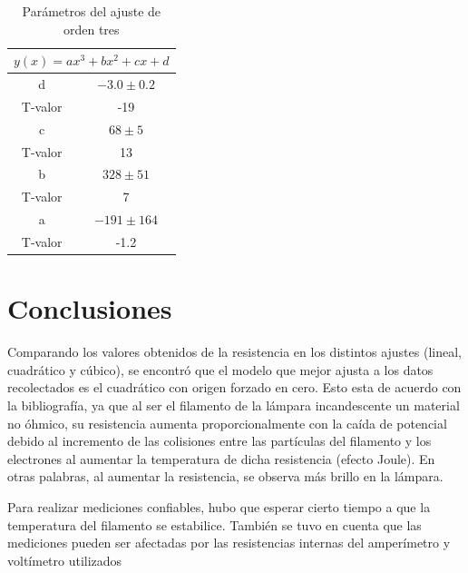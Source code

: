 \documentclass[twoside,twocolumn,a4paper]{article}
\begin{document}
\begin{table}
\centering
\caption{Par\'ametros del ajuste de orden tres}
\label{tab:o3}
\begin{tabular}{|c|c|}
\hline
\multicolumn{2}{|c|}{$y(x)=ax^3+bx^2+cx+d$} \\ \hline
d                  & $-3.0\pm0.2$           \\ \hline
T-valor            & -19                    \\ \hline
c                  & $68\pm5$               \\ \hline
T-valor            & 13                     \\ \hline
b                  & $328\pm51$             \\ \hline
T-valor            & 7                      \\ \hline
a                  & $-191\pm164$           \\ \hline
T-valor            & -1.2                   \\ \hline
\end{tabular}
\end{table}




\section{Conclusiones}


Comparando los valores obtenidos de la resistencia en los distintos ajustes (lineal, cuadr\'atico y c\'ubico), se encontr\'o que el modelo que mejor ajusta a los datos recolectados es el cuadr\'atico con origen forzado en cero. Esto esta de acuerdo con la bibliograf\'ia, ya que al ser el filamento de la l\'ampara incandescente un material no \'ohmico, su resistencia aumenta proporcionalmente con la ca\'ida de potencial debido al incremento de las colisiones entre las part\'iculas del filamento y los electrones al aumentar la temperatura de dicha resistencia (efecto Joule). En otras palabras, al aumentar la resistencia, se observa m\'as brillo en la l\'ampara.
\par Para realizar mediciones confiables, hubo que esperar cierto tiempo a que la temperatura del filamento se estabilice. Tambi\'en se tuvo en cuenta que las mediciones pueden ser afectadas por las resistencias internas del amper\'imetro y volt\'imetro utilizados
\end{document}
